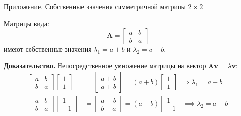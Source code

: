 \documentclass{beamer}
\begin{document}
\begin{frame}{Приложение. Собственные значения симметричной матрицы $2 \times 2$}
	\begin{flushleft}
		Матрицы вида:
		\[
		\mathbf A = \begin{bmatrix} a & b \\ b & a \end{bmatrix}
		\]
		имеют собственные значения $\lambda_1 = a+b$ и $\lambda_2 = a-b$.
		
		\bigskip
		
		\textbf{Доказательство.} Непосредственное умножение матрицы на вектор $\mathbf A\mathbf{v} = \lambda \mathbf{v}$:
		\[
		\begin{aligned}
			\begin{bmatrix} a & b \\ b & a \end{bmatrix} \begin{bmatrix} 1 \\ 1 \end{bmatrix} &= \begin{bmatrix} a+b \\ a+b \end{bmatrix} = (a+b) \begin{bmatrix} 1 \\ 1 \end{bmatrix} \implies \lambda_1 = a+b\\[8pt]
			\begin{bmatrix} a & b \\ b & a \end{bmatrix} \begin{bmatrix} 1 \\ -1 \end{bmatrix} &= \begin{bmatrix} a-b \\ b-a \end{bmatrix} = (a-b) \begin{bmatrix} 1 \\ -1 \end{bmatrix} \implies \lambda_2 = a-b
		\end{aligned}
		\]
		
	\end{flushleft}
\end{frame}
\end{document}
